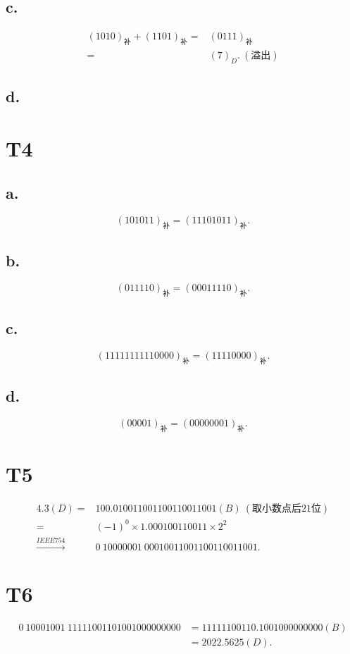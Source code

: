 \documentclass{article}
\begin{document}
    \subsection*{c.}
        \begin{align*}
            {(1010)}_{\mbox{补}}+{(1101)}_{\mbox{补}}
            =&{(0111)}_{\mbox{补}}\\
            =&{(7)}_D.\ (\mbox{溢出})
        \end{align*}
    \subsection*{d.}
\section*{T4}
    \subsection*{a.}
        \[
            {(101011)}_{\mbox{补}}={(11101011)}_{\mbox{补}}.
        \]
    \subsection*{b.}
        \[
            {(011110)}_{\mbox{补}}={(00011110)}_{\mbox{补}}.
        \]
    \subsection*{c.}
        \[
            {(11111111110000)}_{\mbox{补}}={(11110000)}_{\mbox{补}}.
        \]
    \subsection*{d.}
        \[
            {(00001)}_{\mbox{补}}={(00000001)}_{\mbox{补}}.
        \]
\section*{T5}
    \begin{align*}
        4.3(D)
        =&100.0100 1100 1100 1100 11001(B) \ (\mbox{取小数点后21位})\\
        =&{(-1)}^{0}\times 1.000100110011\times 2^{2}\\
        \xrightarrow{IEEE754}& 0\ 1000 0001\ 0001 0011 0011 0011 0011 001.
    \end{align*}
\section*{T6}
    \begin{align*}
        0\ 1000 1001\ 1111 1001 1010 0100 0000 000
        &=1 1111 1001 10.1001 0000 0000 0(B)\\
        &=2022.5625(D).
    \end{align*}
\end{document}
